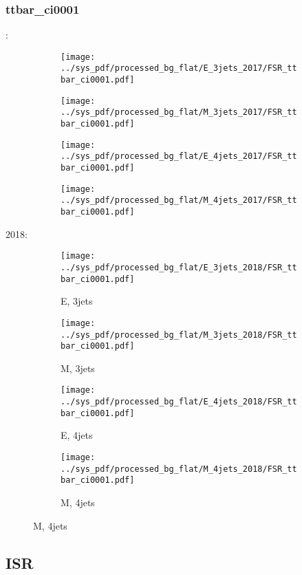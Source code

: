 \documentclass{beamer}
\begin{document}
\begin{frame}
\frametitle{ttbar_ci0001}
\fontsize{5}{1}:
\begin{figure}
\centering
\begin{subfigure}[b]{0.24\textwidth}
\texttt{[image: ../sys\_pdf/processed\_bg\_flat/E\_3jets\_2017/FSR\_ttbar\_ci0001.pdf]}
\end{subfigure}
\begin{subfigure}[b]{0.24\textwidth}
\texttt{[image: ../sys\_pdf/processed\_bg\_flat/M\_3jets\_2017/FSR\_ttbar\_ci0001.pdf]}
\end{subfigure}
\begin{subfigure}[b]{0.24\textwidth}
\texttt{[image: ../sys\_pdf/processed\_bg\_flat/E\_4jets\_2017/FSR\_ttbar\_ci0001.pdf]}
\end{subfigure}
\begin{subfigure}[b]{0.24\textwidth}
\texttt{[image: ../sys\_pdf/processed\_bg\_flat/M\_4jets\_2017/FSR\_ttbar\_ci0001.pdf]}
\end{subfigure}
\end{figure}
2018:
\begin{figure}
\centering
\begin{subfigure}[b]{0.24\textwidth}
\texttt{[image: ../sys\_pdf/processed\_bg\_flat/E\_3jets\_2018/FSR\_ttbar\_ci0001.pdf]}
\captionsetup{font=tiny}
\caption{E, 3jets}
\end{subfigure}
\begin{subfigure}[b]{0.24\textwidth}
\texttt{[image: ../sys\_pdf/processed\_bg\_flat/M\_3jets\_2018/FSR\_ttbar\_ci0001.pdf]}
\captionsetup{font=tiny}
\caption{M, 3jets}
\end{subfigure}
\begin{subfigure}[b]{0.24\textwidth}
\texttt{[image: ../sys\_pdf/processed\_bg\_flat/E\_4jets\_2018/FSR\_ttbar\_ci0001.pdf]}
\captionsetup{font=tiny}
\caption{E, 4jets}
\end{subfigure}
\begin{subfigure}[b]{0.24\textwidth}
\texttt{[image: ../sys\_pdf/processed\_bg\_flat/M\_4jets\_2018/FSR\_ttbar\_ci0001.pdf]}
\captionsetup{font=tiny}
\caption{M, 4jets}
\end{subfigure}
\end{figure}
\end{frame}


\subsection{ISR}
\end{document}
